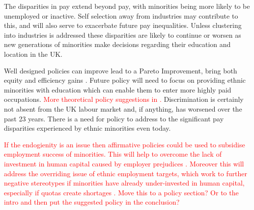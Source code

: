 \documentclass[class=article, crop=false]{standalone}
\begin{document}
The disparities in pay extend beyond pay, with minorities being more likely to be unemployed or inactive. Self selection away from industries may contribute to this, and will also serve to exacerbate future pay inequalities. Unless clustering into industries is addressed these disparities are likely to continue or worsen as new generations of minorities make decisions regarding their education and location in the UK.

Well designed policies can improve lead to a Pareto Improvement, bring both equity and efficiency gains \citep{LundbergB}. Future policy will need to focus on providing ethnic minorities with education which can enable them to enter more highly paid occupations. \textcolor{red}{More theoretical policy suggestions in \citep{LundbergB}.} Discrimination is certainly not absent from the UK labour market and, if anything, has worsened over the past 23 years. There is a need for policy to address to the significant pay disparities experienced by ethnic minorities even today.

\textcolor{red}{
If the endogienity is an issue then affirmative policies could be used to subsidise employment success of minorities. This will help to overcome the lack of investment in human capital caused by employer prejudices \citep{Coate}. Moreover this will address the overriding issue of ethnic employment targets, which work to further negative stereotypes if minorities have already under-invested in human capital, especially if quotas create shortages \citep{Welch}. Move this to a policy section? Or to the intro and then put the suggested policy in the conclusion?
}
\ifstandalone

\fi
\end{document}
